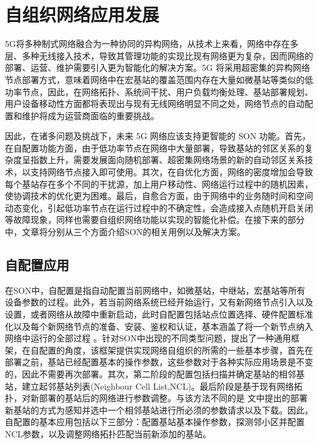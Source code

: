 \documentclass{IEEEtran}
\begin{document}
\section{自组织网络应用发展}
\label{sec:SON}
5G将多种制式网络融合为一种协同的异构网络，从技术上来看，网络中存在多层、多种无线接入技术，导致其管理功能的实现比现有网络更为复杂，因而网络的部署、运营、维护需要引入更为智能化的解决方案。5G 将采用超密集的异构网络节点部署方式，意味着网络中在宏基站的覆盖范围内存在大量如微基站等类似的低功率节点\cite{Moysen2017}，因此，在网络拓扑、系统间干扰、用户负载均衡处理、基站部署规划、用户设备移动性方面都将表现出与现有无线网络明显不同之处，网络节点的自动配置和维护将成为运营商面临的重要挑战。

因此，在诸多问题及挑战下，未来 5G 网络应该支持更智能的 SON 功能\cite{Imran2014}。首先，在自配置功能方面，由于低功率节点在网络中大量部署，导致基站的邻区关系的复杂度呈指数上升，需要发展面向随机部署、超密集网络场景的新的自动邻区关系技术，以支持网络节点接入即可使用。其次，在自优化方面，网络的密度增加会导致每个基站存在多个不同的干扰源，加上用户移动性、网络运行过程中的随机因素， 使协调技术的优化更为困难。最后，自愈合方面，由于网络中的业务随时间和空间动态变化，引起低功率节点在运行过程中的不确定性，会造成接入点随机开启关闭等故障现象，同样也需要自组织网络功能以实现的智能化补偿。在接下来的部分中，文章将分别从三个方面介绍SON的相关用例以及解决方案。
\subsection{自配置应用}
\label{sec:self-configuration}

在SON中，自配置是指自动配置当前网络中，如微基站，中继站，宏基站等所有设备参数的过程。此外，若当前网络系统已经开始运行，又有新网络节点引入以及设置，或者网络从故障中重新启动，此时自配置包括站点位置选择、硬件配置标准化以及每个新网络节点的准备、安装、鉴权和认证，基本涵盖了将一个新节点纳入网络中运行的全部过程 \cite{Aliu2013}。针对SON中出现的不同类型问题，\cite{Wainio2016}提出了一种通用框架，在自配置的角度，该框架提供实现网络自组织的所需的一些基本步骤，首先在部署之前，基站已经配置基本的操作参数，这些参数对于各种实际应用场景是不变的，因此不需要再次部署。其次，第二阶段的配置包括扫描并确定基站的相邻基站，建立起邻基站列表(Neighbour Cell List,NCL)。最后阶段是基于现有网络拓扑，对新部署的基站后的网络进行参数调整。与该方法不同的是 \cite{Hu2010}文中提出的部署新基站的方式为感知并选中一个相邻基站进行所必须的参数请求以及下载。因此，自配置的基本应用包括以下三部分：配置基站基本操作参数，探测邻小区并配置NCL参数，以及调整网络拓扑匹配当前新添加的基站。
\end{document}
